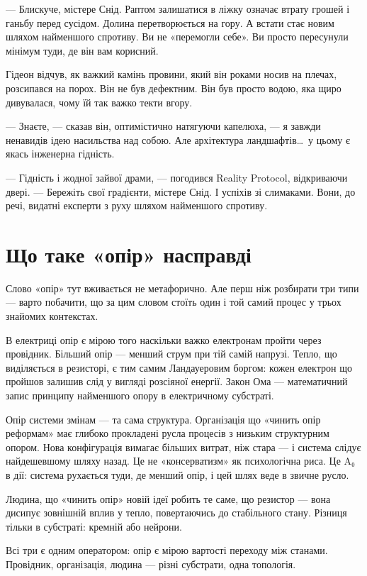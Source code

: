 \documentclass[12pt, a4paper, openany]{book}
\begin{document}
\begin{realitybox}
--- Блискуче, містере Снід. Раптом залишатися в ліжку означає втрату грошей і ганьбу перед сусідом. Долина перетворюється на гору. А встати стає новим шляхом найменшого спротиву. Ви не «перемогли себе». Ви просто пересунули мінімум туди, де він вам корисний.

\medskip
Гідеон відчув, як важкий камінь провини, який він роками носив на плечах, розсипався на порох. Він не був дефектним. Він був просто водою, яка щиро дивувалася, чому їй так важко текти вгору.

--- Знаєте, --- сказав він, оптимістично натягуючи капелюха, --- я завжди ненавидів ідею насильства над собою. Але архітектура ландшафтів\ldots\ у цьому є якась інженерна гідність.

--- Гідність і жодної зайвої драми, --- погодився Reality Protocol, відкриваючи двері. --- Бережіть свої градієнти, містере Снід. І успіхів зі слимаками. Вони, до речі, видатні експерти з руху шляхом найменшого спротиву.
\end{realitybox}

\chapter{Що таке «опір» насправді}

Слово «опір» тут вживається не метафорично. Але перш ніж розбирати три типи --- варто побачити, що за цим словом стоїть один і той самий процес у трьох знайомих контекстах.

В електриці опір є мірою того наскільки важко електронам пройти через провідник. Більший опір --- менший струм при тій самій напрузі. Тепло, що виділяється в резисторі, є тим самим Ландауеровим боргом: кожен електрон що пройшов залишив слід у вигляді розсіяної енергії. Закон Ома --- математичний запис принципу найменшого опору в електричному субстраті.

Опір системи змінам --- та сама структура. Організація що «чинить опір реформам» має глибоко прокладені русла процесів з низьким структурним опором. Нова конфігурація вимагає більших витрат, ніж стара --- і система слідує найдешевшому шляху назад. Це не «консерватизм» як психологічна риса. Це A₀ в дії: система рухається туди, де менший опір, і цей шлях веде в звичне русло.

Людина, що «чинить опір» новій ідеї робить те саме, що резистор --- вона дисипує зовнішній вплив у тепло, повертаючись до стабільного стану. Різниця тільки в субстраті: кремній або нейрони.

Всі три є одним оператором: опір є мірою вартості переходу між станами. Провідник, організація, людина --- різні субстрати, одна топологія.
\end{document}
